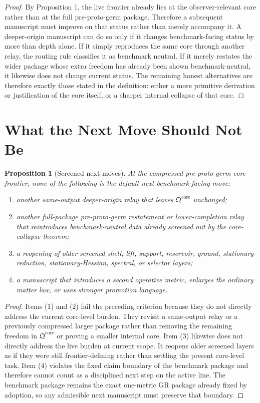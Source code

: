 \documentclass[11pt]{article}
\newcommand{\PreProtoCore}{\mathfrak Q^{\mathrm{core}}}
\newtheorem{proposition}{Proposition}
\begin{document}
\begin{proof}
By Proposition 1, the live frontier already lies at the observer-relevant core rather than at the full pre-proto-germ package. Therefore a subsequent manuscript must improve on that status rather than merely accompany it. A deeper-origin manuscript can do so only if it changes benchmark-facing status by more than depth alone. If it simply reproduces the same core through another relay, the routing rule classifies it as benchmark neutral. If it merely restates the wider package whose extra freedom has already been shown benchmark-neutral, it likewise does not change current status. The remaining honest alternatives are therefore exactly those stated in the definition: either a more primitive derivation or justification of the core itself, or a sharper internal collapse of that core.
\end{proof}

\section{What the Next Move Should Not Be}

\begin{proposition}[Screened next moves]
At the compressed pre-proto-germ core frontier, none of the following is the default next benchmark-facing move:
\begin{enumerate}
    \item another same-output deeper-origin relay that leaves \(\PreProtoCore\) unchanged;
    \item another full-package pre-proto-germ restatement or lower-completion relay that reintroduces benchmark-neutral data already screened out by the core-collapse theorem;
    \item a reopening of older screened shell, lift, support, reservoir, ground, stationary-reduction, stationary-Hessian, spectral, or selector layers;
    \item a manuscript that introduces a second operative metric, enlarges the ordinary matter law, or uses stronger promotion language.
\end{enumerate}
\end{proposition}

\begin{proof}
Items (1) and (2) fail the preceding criterion because they do not directly address the current core-level burden. They revisit a same-output relay or a previously compressed larger package rather than removing the remaining freedom in \(\PreProtoCore\) or proving a smaller internal core. Item (3) likewise does not directly address the live burden at current scope. It reopens older screened layers as if they were still frontier-defining rather than settling the present core-level task. Item (4) violates the fixed claim boundary of the benchmark package and therefore cannot count as a disciplined next step on the active line. The benchmark package remains the exact one-metric GR package already fixed by adoption, so any admissible next manuscript must preserve that boundary.
\end{proof}
\end{document}
